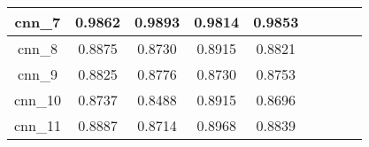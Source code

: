 \begin{table}[h]
\begin{tabular} {|c|c|c|c|c|c|c|c|c| }
        cnn\_7   & \cellcolor{green!50}0.9862   & \cellcolor{green!50}0.9893 & \cellcolor{green!50}0.9814 & \cellcolor{green!50}0.9853 \\ \hline
        cnn\_8   & 0.8875                       & 0.8730                     & 0.8915                     & 0.8821                     \\ \hline
        cnn\_9   & 0.8825                       & 0.8776                     & 0.8730                     & 0.8753                     \\ \hline
        cnn\_10  & 0.8737                       & 0.8488                     & 0.8915                     & 0.8696                     \\ \hline
        cnn\_11  & 0.8887                       & 0.8714                     & 0.8968                     & 0.8839                     \\ \hline
    \end{tabular}
\end{table}


